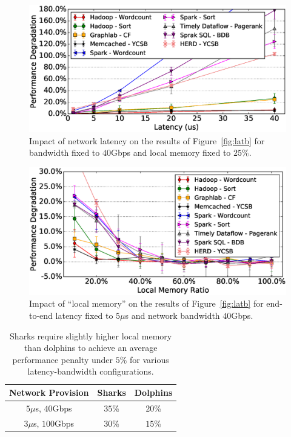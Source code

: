 \begin{figure}[t]
  \centering
    \includegraphics[width=\columnwidth]{img/fix_bw_vary_latency.eps} 
  \caption{\small{Impact of network latency on the results of Figure~\ref{fig:latb} for bandwidth fixed to $40$Gbps and local memory fixed to $25\%$. }} %
  \label{fig:impl}
\end{figure}
%
%
\begin{figure}[t]
  \centering
    \includegraphics[width=\columnwidth]{img/vary_remote_mem.eps} 
  \caption{\small{Impact of ``local memory'' on the results of Figure~\ref{fig:latb} for end-to-end latency fixed to $5\mu$s and network bandwidth $40$Gbps.}} %
  \label{fig:impb}
\end{figure}
%
%
\begin{table}[t]
    \centering
    \small
    \begin{tabular}{c|c|c}
    \textbf{Network Provision} & \textbf{Sharks} & \textbf{Dolphins}\\
    \hline\hline
    $5\mu$s, $40$Gbps & $35$\% & $20$\%\\\hline
    $3\mu$s, $100$Gbps & $30$\% & $15$\%\\\hline\hline
    \end{tabular}
    \caption{Sharks require slightly higher local memory than dolphins to achieve an average performance penalty under $5\%$ for various latency-bandwidth configurations.}
    \label{tab:rmem}
\end{table}
